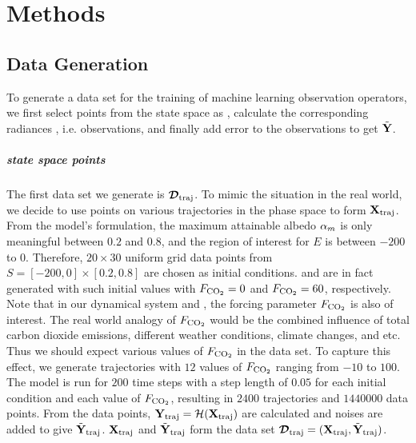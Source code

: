 \chapter{Methods}
\section{Data Generation}\label{sec:datageneration}
\par To generate a data set for the training of machine learning observation operators, we first select points from the state space as \mX , calculate the corresponding radiances \mY, i.e. observations, and finally add error to the observations to get $\tilde{\textbf{Y}}$. 

\paragraph{state space points} The first data set we generate is $\bm{\mathcal{D}}_{\text{traj}}$. To mimic the situation in the real world, we decide to use points on various trajectories in the phase space to form $\textbf{X}_{\text{traj}}$. From the model's formulation, the maximum attainable albedo $\alpha_m$ is only meaningful between $0.2$ and $0.8$, and the region of interest for $E$ is between $-200$ to $0$. Therefore, $20\times 30$ uniform grid data points from $S=[-200,0]\times[0.2,0.8]$ are chosen as initial conditions.  and  are in fact generated with such initial values with $F_{\text{CO}_2}=0$ and $F_{\text{CO}_2}=60$, respectively. Note that in our dynamical system  and , the forcing parameter $F_{\text{CO}_2}$ is also of interest. The real world analogy of $F_{\text{CO}_2}$ would be the combined influence of total carbon dioxide emissions, different weather conditions, climate changes, and etc. Thus we should expect various values of $F_{\text{CO}_2}$ in the data set. To capture this effect, we generate trajectories with $12$ values of $F_{\text{CO}_2}$ ranging from $-10$ to $100$. The model is run for $200$ time steps with a step length of $0.05$ for each initial condition and each value of $F_{\text{CO}_2}$, resulting in $2400$ trajectories and $1440000$ data points. From the data points, $\textbf{Y}_{\text{traj}}=\mathcal{H}(\textbf{X}_{\text{traj}})$ are calculated and noises are added to give $\tilde{\textbf{Y}}_{\text{traj}}$. $\textbf{X}_{\text{traj}}$ and $\tilde{\textbf{Y}}_{\text{traj}}$ form the data set $\bm{\mathcal{D}}_{\text{traj}}=(\textbf{X}_{\text{traj}},\tilde{\textbf{Y}}_{\text{traj}})$.

